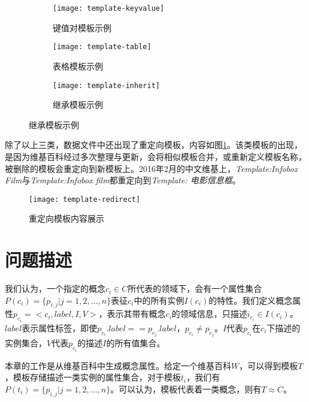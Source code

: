 \begin{figure}[h]
  \caption{模板类型举例}
  \label{fig:template-examples}

  \begin{subfigure}{3cm}
    \texttt{[image: template-keyvalue]}
    \caption{键值对模板示例}
  \end{subfigure}%
  \hspace{4em}%

  \begin{subfigure}{3cm}
    \texttt{[image: template-table]}
    \caption{表格模板示例}
  \end{subfigure}%
  \hspace{4em}%

  \begin{subfigure}{3cm}
    \texttt{[image: template-inherit]}
    \caption{继承模板示例}
  \end{subfigure}%
\end{figure}

除了以上三类，数据文件中还出现了{\heiti 重定向模板}，内容如图\ref{fig:template-redirect}。该类模板的出现，是因为维基百科经过多次整理与更新，会将相似模板合并，或重新定义模板名称，被删除的模板会重定向到新模板上。2016年2月的中文维基上，\textit{Template:Infobox Film}与\textit{Template:Infobox film}都重定向到\textit{Template: 电影信息框}。

\begin{figure}[H]
  \centering
  \texttt{[image: template-redirect]}
  \caption{重定向模板内容展示}
  \label{fig:template-redirect}
\end{figure}

\section{问题描述}

我们认为，一个指定的概念$c_i \in C$所代表的领域下，会有一个属性集合$P(c_i)=\{p_{i,j}|j=1,2,...,n\}$表征$c_i$中的所有实例$I(c_i)$的特性。我们定义概念属性$p_{c_i}= <c_i, label, I, V>$，表示其带有概念$c_i$的领域信息，只描述$i_{c_i} \in I(c_i)$。$label$表示属性标签，即使$p_{c_i}.label == p_{c_j}.label$，$p_{c_i} \neq p_{c_j}$。$I$代表$p_{c_i}$在$c_i$下描述的实例集合，$V$代表$p_{c_i}$的描述$I$的所有值集合。

本章的工作是从维基百科中生成概念属性。给定一个维基百科$W$，可以得到模板$T$，模板存储描述一类实例的属性集合，对于模板$t_i$，我们有$P(t_i)=\{p_{i,j}|j=1,2,...,n\}$。可以认为，模板代表着一类概念，则有$T \approx C$。


